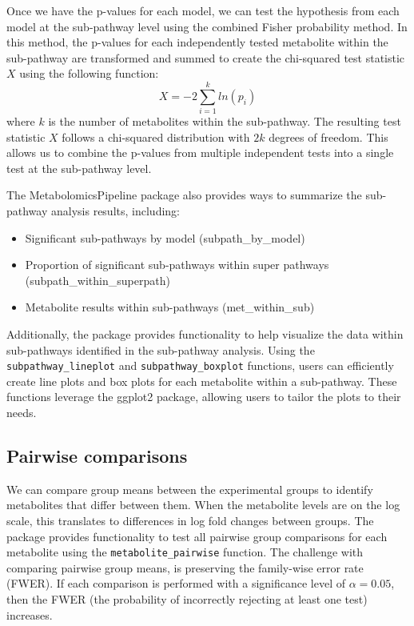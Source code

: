 Once we have the p-values for each model, we can test the hypothesis from each model at the sub-pathway level using the combined Fisher probability method. In this method, the p-values for each independently tested metabolite within the sub-pathway are transformed and summed to create the chi-squared test statistic \(X\) using the following function:
\[
X = -2\sum_{i=1}^k ln(p_i)
\]
where \(k\) is the number of metabolites within the sub-pathway. The resulting test statistic \(X\) follows a chi-squared distribution with \(2k\) degrees of freedom. This allows us to combine the p-values from multiple independent tests into a single test at the sub-pathway level.

The MetabolomicsPipeline package also provides ways to summarize the sub-pathway analysis results, including:

\begin{itemize}
\item
  Significant sub-pathways by model (subpath\_by\_model)
\item
  Proportion of significant sub-pathways within super pathways (subpath\_within\_superpath)
\item
  Metabolite results within sub-pathways (met\_within\_sub)
\end{itemize}

Additionally, the package provides functionality to help visualize the data within sub-pathways identified in the sub-pathway analysis. Using the \texttt{subpathway\_lineplot} and \texttt{subpathway\_boxplot} functions, users can efficiently create line plots and box plots for each metabolite within a sub-pathway. These functions leverage the ggplot2 package, allowing users to tailor the plots to their needs.

\subsection{Pairwise comparisons}\label{pairwise-comparisons}

We can compare group means between the experimental groups to identify metabolites that differ between them. When the metabolite levels are on the log scale, this translates to differences in log fold changes between groups. The  package provides functionality to test all pairwise group comparisons for each metabolite using the \texttt{metabolite\_pairwise} function. The challenge with comparing pairwise group means, is preserving the family-wise error rate (FWER). If each comparison is performed with a significance level of \(\alpha=0.05\), then the FWER (the probability of incorrectly rejecting at least one test) increases.

